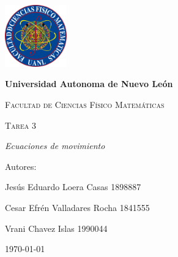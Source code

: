 \begin{titlepage}
    \centering
    {\includegraphics[width=0.2\textwidth]{FCFM.png}\par}
    \vspace{1cm}
    {\bfseries\LARGE Universidad Autonoma de Nuevo León \par}
    \vspace{1cm}
    {\scshape\Large Facultad de Ciencias Físico Matemáticas \par}
    \vspace{3cm}
    {\scshape\Huge Tarea 3  \par}
    \vspace{3cm}
    {\itshape\Large Ecuaciones de movimiento \par}
    \vfill
    {\Large Autores: \par}
    \vfill
    {\Large Jesús Eduardo Loera Casas 1898887 \par}
    \vfill{\Large Cesar Efrén Valladares Rocha 1841555 \par}
    \vfill
    {\Large Vrani Chavez Islas 1990044 \par}
    \vfill
    {\Large \today \par}
\end{titlepage}